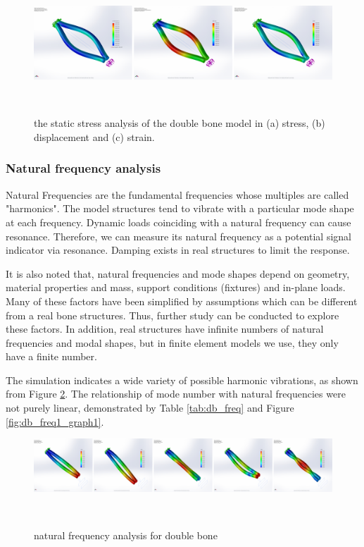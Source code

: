 \documentclass{sigchi}
\begin{document}
\begin{figure}
\centering
  \includegraphics[width=1.95\columnwidth]{figures/db_stat_ana}
  \caption{the static stress analysis of the double bone model in (a) stress, (b) displacement and (c) strain.}~\label{fig:db_stat_ana}
\end{figure}


\subsubsection{Natural frequency analysis}

Natural Frequencies are the fundamental frequencies whose multiples are called "harmonics". The model structures tend to vibrate with a particular mode shape at each frequency. Dynamic loads coinciding with a natural frequency can cause resonance. Therefore, we can measure its natural frequency as a potential signal indicator via resonance. Damping exists in real structures to limit the response.

It is also noted that, natural frequencies and mode shapes depend on geometry, material properties and mass, support conditions (fixtures) and in-plane loads. Many of these factors have been simplified by assumptions which can be different from a real bone structures. Thus, further study can be conducted to explore these factors. In addition, real structures have infinite numbers of natural frequencies and modal shapes, but in finite element models we use, they only have a finite number.

The simulation indicates a wide variety of possible harmonic vibrations, as shown from Figure \ref{fig:db_freq1}. The relationship of mode number with natural frequencies were not purely linear, demonstrated by Table \ref{tab:db_freq} and Figure \ref{fig:db_freq1_graph1}.

\begin{figure}
  \centering
  \includegraphics[width=1.95\columnwidth]{figures/db_freq1}
  \caption{natural frequency analysis for double bone}
    ~\label{fig:db_freq1}
\end{figure}
\end{document}
